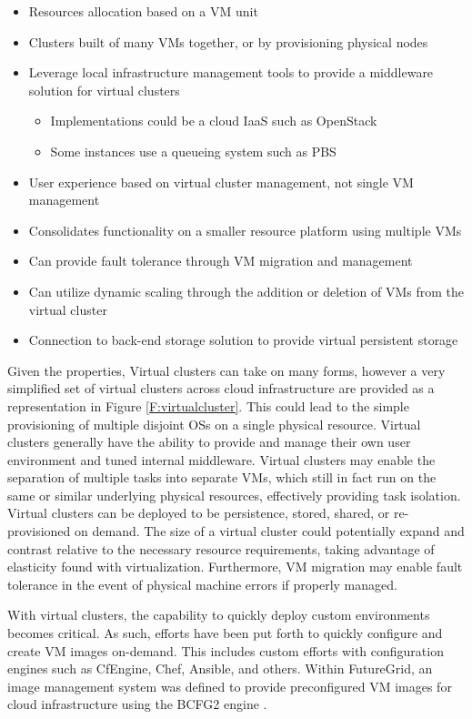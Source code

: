 
\begin{itemize}
\item Resources allocation based on a VM unit
\item Clusters built of many VMs together, or by provisioning physical nodes
\item Leverage local infrastructure management tools to provide a middleware solution for virtual clusters
	\begin{itemize}
	\item Implementations could be a cloud IaaS such as OpenStack
	\item Some instances use a queueing system such as PBS
	\end{itemize}
\item User experience based on virtual cluster management, not single VM management
\item Consolidates functionality on a smaller resource platform using multiple VMs 
\item Can provide fault tolerance through VM migration and management
\item Can utilize dynamic scaling through the addition or deletion of VMs from the virtual cluster
\item Connection to back-end storage solution to provide virtual persistent storage
\end{itemize}


Given the properties, Virtual clusters can take on many forms, however a very simplified set of virtual clusters across cloud infrastructure are provided as a representation in Figure \ref{F:virtualcluster}. This could lead to the simple provisioning of multiple disjoint OSs on a single physical resource. Virtual clusters generally have the ability to provide and manage their own user environment and tuned internal middleware.  Virtual clusters may enable the separation of multiple tasks into separate VMs, which still in fact run on the same or similar underlying physical resources, effectively providing task isolation.  Virtual clusters can be deployed to be persistence, stored, shared, or re-provisioned on demand.  The size of a virtual cluster could potentially expand and contrast relative to the necessary resource requirements, taking advantage of elasticity found with virtualization. Furthermore, VM migration may enable fault tolerance in the event of physical machine errors if properly managed. 

With virtual clusters, the capability to quickly deploy custom environments becomes critical. As such, efforts have been put forth to quickly configure and create VM images on-demand. This includes custom efforts with configuration engines such as CfEngine, Chef, Ansible, and others. Within FutureGrid, an image management system was defined to provide preconfigured VM images for cloud infrastructure using the BCFG2 engine \cite{Diaz2011cca}.

